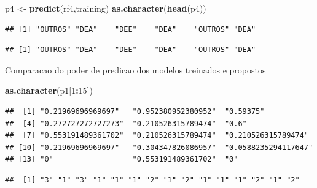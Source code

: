 \documentclass[]{article}
\newenvironment{Shaded}{\begin{snugshade}}{\end{snugshade}}
\newcommand{\KeywordTok}[1]{\textcolor[rgb]{0.13,0.29,0.53}{\textbf{#1}}}
\newcommand{\DecValTok}[1]{\textcolor[rgb]{0.00,0.00,0.81}{#1}}
\newcommand{\StringTok}[1]{\textcolor[rgb]{0.31,0.60,0.02}{#1}}
\newcommand{\OperatorTok}[1]{\textcolor[rgb]{0.81,0.36,0.00}{\textbf{#1}}}
\newcommand{\NormalTok}[1]{#1}
\begin{document}
\begin{Shaded}
\begin{Highlighting}[]
\NormalTok{p4 <-}\StringTok{ }\KeywordTok{predict}\NormalTok{(rf4,training)}
\KeywordTok{as.character}\NormalTok{(}\KeywordTok{head}\NormalTok{(p4))}
\end{Highlighting}
\end{Shaded}

\begin{verbatim}
## [1] "OUTROS" "DEA"    "DEE"    "DEA"    "OUTROS" "DEA"
\end{verbatim}

\begin{Shaded}
\end{Shaded}

\begin{verbatim}
## [1] "OUTROS" "DEA"    "DEE"    "DEA"    "OUTROS" "DEA"
\end{verbatim}

Comparacao do poder de predicao dos modelos treinados e propostos

\begin{Shaded}
\begin{Highlighting}[]
\KeywordTok{as.character}\NormalTok{(p1[}\DecValTok{1}\OperatorTok{:}\DecValTok{15}\NormalTok{])}
\end{Highlighting}
\end{Shaded}

\begin{verbatim}
##  [1] "0.21969696969697"   "0.952380952380952"  "0.59375"           
##  [4] "0.272727272727273"  "0.210526315789474"  "0.6"               
##  [7] "0.553191489361702"  "0.210526315789474"  "0.210526315789474" 
## [10] "0.21969696969697"   "0.304347826086957"  "0.0588235294117647"
## [13] "0"                  "0.553191489361702"  "0"
\end{verbatim}

\begin{Shaded}
\end{Shaded}

\begin{verbatim}
##  [1] "3" "1" "3" "1" "1" "1" "2" "1" "2" "1" "1" "1" "2" "1" "2"
\end{verbatim}
\end{document}
